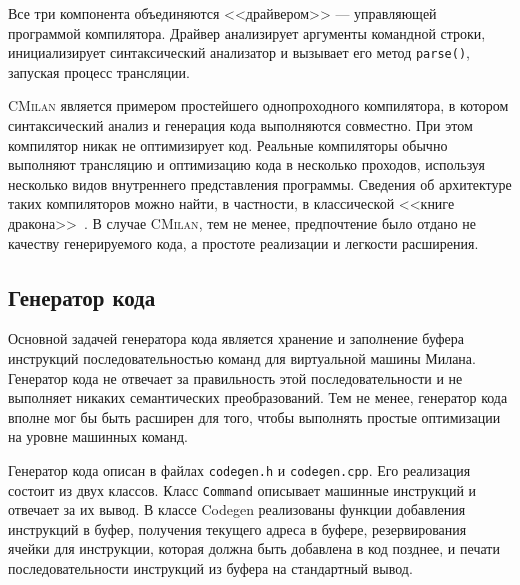 \documentclass[a4paper,12pt]{article}
\begin{document}
Все три компонента объединяются <<драйвером>> --- управляющей программой
компилятора. Драйвер анализирует аргументы командной строки, инициализирует
синтаксический анализатор и вызывает его метод \texttt{parse()}, запуская
процесс трансляции.

\textsc{CMilan} является примером простейшего однопроходного компилятора,
в котором синтаксический анализ и генерация кода выполняются совместно. При этом
компилятор никак не оптимизирует код. Реальные компиляторы
обычно выполняют трансляцию и оптимизацию кода в несколько проходов, используя
несколько видов внутреннего представления программы. Сведения об архитектуре
таких компиляторов можно найти, в частности, в классической <<книге
дракона>>~\cite{dragonbook11}. В случае \textsc{CMilan}, тем не менее,
предпочтение было отдано не качеству генерируемого кода, а простоте реализации и
легкости расширения.

\subsection{Генератор кода}

Основной задачей генератора кода является хранение и заполнение буфера
инструкций последовательностью команд для виртуальной машины Милана. Генератор
кода не отвечает за правильность этой последовательности и не выполняет никаких
семантических преобразований. Тем не менее, генератор кода вполне мог бы быть
расширен для того, чтобы выполнять простые оптимизации на уровне машинных
команд.

Генератор кода описан в файлах \texttt{codegen.h} и \texttt{codegen.cpp}. Его
реализация состоит из двух классов. Класс \texttt{Command} описывает машинные
инструкций и отвечает за их вывод. В классе Codegen реализованы функции добавления
инструкций в буфер, получения текущего адреса в буфере, резервирования ячейки
для инструкции, которая должна быть добавлена в код позднее, и печати
последовательности инструкций из буфера на стандартный вывод.
\end{document}
